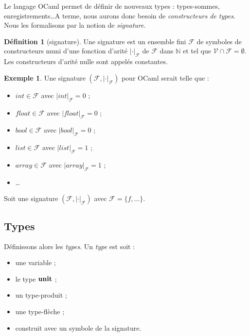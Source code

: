\documentclass[a4paper]{report}
\theoremstyle{definition}
\newtheorem{definition}[theoreme]{Définition}
\newtheorem{exemple}[theoreme]{Exemple}
\newcommand{\unit}{\bold{unit}}
\newcommand{\V}{\mathscr{V}}
\newcommand{\F}{\mathscr{F}}
\begin{document}
Le langage OCaml permet de définir de nouveaux types : types-sommes, enregistrements\dots A terme, nous aurons donc besoin de \emph{constructeurs de types}. Nous les formalisons par la notion de \emph{signature}.

\begin{definition}[signature]
	Une signature est un ensemble fini $\F$ de symboles de constructeurs muni d'une fonction d'arité $| \cdot |_\F$ de $\F$ dans $\mathbb{N}$ et tel que $\V \cap \F = \emptyset$. Les constructeurs d'arité nulle sont appelés constantes.
\end{definition}

\begin{exemple}
	Une signature $( \F, | \cdot |_\F )$ pour OCaml serait telle que :
	\begin{itemize}
		\item $int \in \F$ avec $| int |_\F = 0$ ;
		\item $float \in \F$ avec $| float |_\F = 0$ ;
		\item $bool \in \F$ avec $| bool |_\F = 0$ ;
		\item $list \in \F$ avec $| list |_\F = 1$ ;
		\item $array \in \F$ avec $| array |_\F = 1$ ;
		\item \dots
	\end{itemize}
\end{exemple}

Soit une signature $( \F, | \cdot |_\F )$ avec $\F = \{ f, \dots \}$.


\subsection{Types}

Définissons alors les \emph{types}. Un \emph{type} est soit :
\begin{itemize}[nosep]
	\item une variable ;
	\item le type $\unit$ ;
	\item un type-produit ;
	\item une type-flèche ;
	\item construit avec un symbole de la signature.
\end{itemize}
\end{document}
